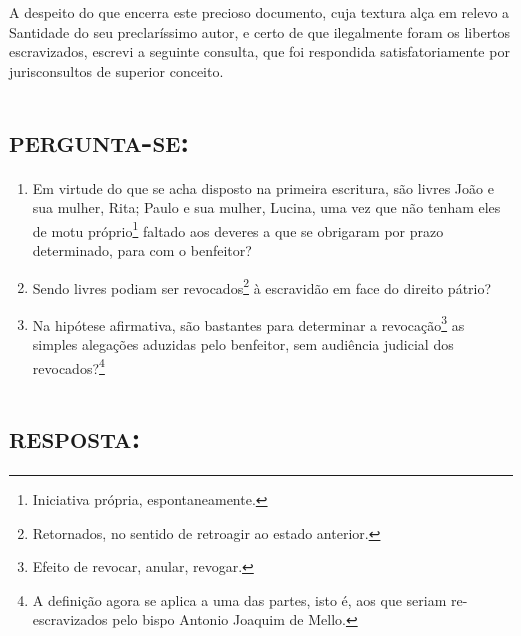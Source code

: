 A despeito do que encerra este precioso documento, cuja textura alça em
relevo a Santidade do seu preclaríssimo autor, e certo de que
ilegalmente foram os libertos escravizados, escrevi a seguinte consulta,
que foi respondida satisfatoriamente por jurisconsultos de superior
conceito.

\section{\textsc{pergunta-se}:}

\begin{enumerate}[label=\arabic*º:]
\item Em virtude do que se acha disposto na primeira escritura, são livres
João e sua mulher, Rita; Paulo e sua mulher, Lucina, uma vez que não
tenham eles de motu próprio\footnote{Iniciativa própria,
  espontaneamente.} faltado aos deveres a que se obrigaram por prazo
determinado, para com o benfeitor?

\item Sendo livres podiam ser revocados\footnote{Retornados, no sentido
  de retroagir ao estado anterior.} à escravidão em face do direito
pátrio?

\item Na hipótese afirmativa, são bastantes para determinar a
revocação\footnote{Efeito de revocar, anular, revogar.} as simples
alegações aduzidas pelo benfeitor, sem audiência judicial dos
revocados?\footnote{A definição agora se aplica a uma das partes, isto
  é, aos que seriam re-escravizados pelo bispo Antonio Joaquim de Mello.}
\end{enumerate}

\section{\textsc{resposta}:}

